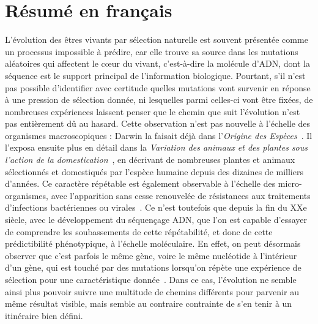 
\chapter{Résumé en français}
\label{chap:fr-intro}

L'évolution des êtres vivants par sélection naturelle est souvent présentée comme un processus impossible à prédire, car elle trouve sa source dans les mutations aléatoires qui affectent le cœur du vivant, c'est-à-dire la molécule d'ADN, dont la séquence est le support principal de l'information biologique.
Pourtant, s'il n'est pas possible d'identifier avec certitude quelles mutations vont survenir en réponse à une pression de sélection donnée, ni lesquelles parmi celles-ci vont être fixées, de nombreuses expériences laissent penser que le chemin que suit l'évolution n'est pas entièrement dû au hasard.
Cette observation n'est pas nouvelle à l'échelle des organismes macroscopiques : Darwin la faisait déjà dans l'\emph{Origine des Espèces}~\citep{darwin1859}.
Il l'exposa ensuite plus en détail dans la \emph{Variation des animaux et des plantes sous l'action de la domestication}~\citep{darwin1868}, en décrivant de nombreuses plantes et animaux sélectionnés et domestiqués par l'espèce humaine depuis des dizaines de milliers d'années.
Ce caractère répétable est également observable à l'échelle des micro-organismes, avec l'apparition sans cesse renouvelée de résistances aux traitements d'infections bactériennes ou virales~\citep{levy2004}.
Ce n'est toutefois que depuis la fin du XXe siècle, avec le développement du séquençage ADN, que l'on est capable d'essayer de comprendre les soubassements de cette répétabilité, et donc de cette prédictibilité phénotypique, à l'échelle moléculaire.
En effet, on peut désormais observer que c'est parfois le même gène, voire le même nucléotide à l'intérieur d'un gène, qui est touché par des mutations lorsqu'on répète une expérience de sélection pour une caractéristique donnée~\citep{wortel2021}.
Dans ce cas, l'évolution ne semble ainsi plus pouvoir suivre une multitude de chemins différents pour parvenir au même résultat visible, mais semble au contraire contrainte de s'en tenir à un itinéraire bien défini.


